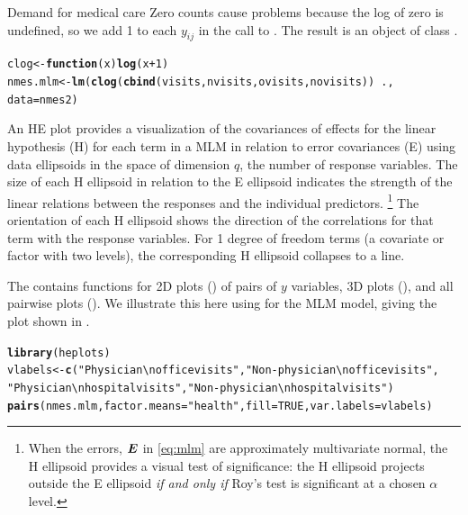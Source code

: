 \documentclass[11pt]{book}\usepackage[]{graphicx}\usepackage[]{color}
\makeatletter
\newcommand{\hlnum}[1]{\textcolor[rgb]{0.686,0.059,0.569}{#1}}%
\newcommand{\hlstr}[1]{\textcolor[rgb]{0.192,0.494,0.8}{#1}}%
\newcommand{\hlopt}[1]{\textcolor[rgb]{0,0,0}{#1}}%
\newcommand{\hlstd}[1]{\textcolor[rgb]{0.345,0.345,0.345}{#1}}%
\newcommand{\hlkwa}[1]{\textcolor[rgb]{0.161,0.373,0.58}{\textbf{#1}}}%
\newcommand{\hlkwb}[1]{\textcolor[rgb]{0.69,0.353,0.396}{#1}}%
\newcommand{\hlkwc}[1]{\textcolor[rgb]{0.333,0.667,0.333}{#1}}%
\newcommand{\hlkwd}[1]{\textcolor[rgb]{0.737,0.353,0.396}{\textbf{#1}}}%
\newenvironment{kframe}{%
 \def\at@end@of@kframe{}%
 \ifinner\ifhmode%
  \def\at@end@of@kframe{\end{minipage}}%
  \begin{minipage}{\columnwidth}%
 \fi\fi%
 \def\FrameCommand##1{\hskip\@totalleftmargin \hskip-\fboxsep
 \colorbox{shadecolor}{##1}\hskip-\fboxsep
     \hskip-\linewidth \hskip-\@totalleftmargin \hskip\columnwidth}%
 \MakeFramed {\advance\hsize-\width
   \@totalleftmargin\z@ \linewidth\hsize
   \@setminipage}}%
 {\par\unskip\endMakeFramed%
 \at@end@of@kframe}
\newenvironment{knitrout}{}{} %
\renewenvironment{knitrout}{\small\renewcommand{\baselinestretch}{.85}}{} %
\makeatother
\begin{document}
\begin{Example}[nmes4]{Demand for medical care}
Zero counts cause problems because the log of zero is undefined, so we add 1 to each $y_{ij}$
in the call to .  The result is an object of class .
\begin{knitrout}
\color{fgcolor}\begin{kframe}
\begin{alltt}
\hlstd{clog} \hlkwb{<-} \hlkwa{function}\hlstd{(}\hlkwc{x}\hlstd{)} \hlkwd{log}\hlstd{(x}\hlopt{+}\hlnum{1}\hlstd{)}
\hlstd{nmes.mlm} \hlkwb{<-} \hlkwd{lm}\hlstd{(}\hlkwd{clog}\hlstd{(}\hlkwd{cbind}\hlstd{(visits, nvisits, ovisits, novisits))} \hlopt{~} \hlstd{.,}
               \hlkwc{data}\hlstd{=nmes2)}
\end{alltt}
\end{kframe}
\end{knitrout}

An HE plot provides a visualization of the covariances of effects for the linear hypothesis (H)
for each term in a MLM in relation to error covariances (E) using data ellipsoids in the
space of dimension $q$, the number of response variables.
The size of each H ellipsoid in relation to the E ellipsoid indicates the
strength of the linear relations between the responses and the individual predictors.%
\footnote{When the errors, $\bm{E}$ in \eqref{eq:mlm} are approximately multivariate normal,
the H ellipsoid provides a visual test of significance:  the H ellipsoid projects
outside the E ellipsoid \emph{if and only if} Roy's test is significant at a chosen $\alpha$ level.
}
The orientation of each H ellipsoid shows the direction of the correlations for that term
with the response variables.
For 1 degree of freedom terms (a covariate or factor with two levels), the corresponding
H ellipsoid collapses to a line.

The  contains functions for 2D plots () of pairs of $y$ variables,
3D plots (), and all pairwise plots ().  We illustrate this here
using  for the MLM model, giving the plot shown in .
\begin{knitrout}
\color{fgcolor}\begin{kframe}
\begin{alltt}
\hlkwd{library}\hlstd{(heplots)}
\hlstd{vlabels} \hlkwb{<-} \hlkwd{c}\hlstd{(}\hlstr{"Physician\textbackslash{}noffice visits"}\hlstd{,} \hlstr{"Non-physician\textbackslash{}n office visits"}\hlstd{,}
             \hlstr{"Physician\textbackslash{}nhospital visits"}\hlstd{,} \hlstr{"Non-physician\textbackslash{}nhospital visits"}\hlstd{)}
\hlkwd{pairs}\hlstd{(nmes.mlm,} \hlkwc{factor.means}\hlstd{=}\hlstr{"health"}\hlstd{,} \hlkwc{fill}\hlstd{=}\hlnum{TRUE}\hlstd{,} \hlkwc{var.labels}\hlstd{=vlabels)}
\end{alltt}
\end{kframe}\begin{figure}[!htbp]



\end{figure}
\end{knitrout}
\end{Example}
\end{document}
